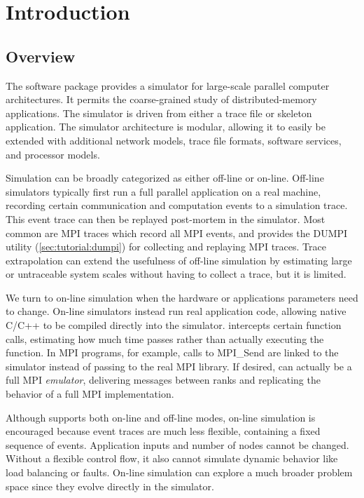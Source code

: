 
\chapter{Introduction}
\label{sec:intro}

\section{Overview}
\label{sec:intro:overview}

The \sstmacro software package provides a simulator for large-scale parallel computer architectures. 
It permits the coarse-grained study of distributed-memory applications. 
The simulator is driven from either a trace file or skeleton application. 
The simulator architecture is modular, allowing it to easily be extended with additional network models, 
trace file formats, software services, and processor models.

Simulation can be broadly categorized as either off-line or on-line.
Off-line simulators typically first run a full parallel application on a real machine,
recording certain communication and computation events to a simulation trace.
This event trace can then be replayed post-mortem in the simulator.
Most common are MPI traces which record all MPI events, and
\sstmacro provides the DUMPI utility (\ref{sec:tutorial:dumpi}) for collecting and replaying MPI traces. 
Trace extrapolation can extend the usefulness of off-line simulation by estimating large or untraceable system scales without having to collect a trace, but it is limited.

We turn to on-line simulation when the hardware or applications parameters need to change.
On-line simulators instead run real application code, allowing native C/C++ to be compiled directly into the simulator.
\sstmacro intercepts certain function calls, estimating how much time passes rather than actually executing the function.
In MPI programs, for example, calls to MPI\_Send are linked to the simulator instead of passing to the real MPI library.
If desired, \sstmacro can actually be a full MPI \emph{emulator}, delivering messages between ranks and replicating the behavior of a full MPI implementation.

Although \sstmacro supports both on-line and off-line modes, on-line simulation is encouraged because
event traces are much less flexible, containing a fixed sequence of events.
Application inputs and number of nodes cannot be changed. 
Without a flexible control flow, it also cannot simulate dynamic behavior like load balancing or faults.
On-line simulation can explore a much broader problem space since they evolve directly in the simulator.

